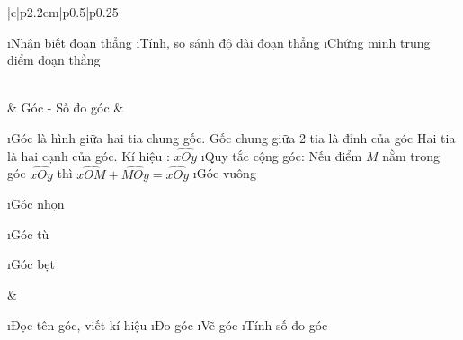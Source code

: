 \begin{tabular}{|c|p{2.2cm}|p{0.5\linewidth}|p{0.25\linewidth}|}
\begin{enumerate}[--,leftmargin=*]
		\i Nhận biết đoạn thẳng 
		\i Tính, so sánh độ dài đoạn thẳng 
		\i Chứng minh trung điểm đoạn thẳng
	\end{enumerate}\\
	 &	Góc - Số đo góc	&
	\begin{enumerate}[--,leftmargin=*]
		\i Góc là hình giữa hai tia chung gốc.
		Gốc chung giữa 2 tia là đỉnh của góc Hai tia là hai cạnh của góc. 
		Kí hiệu : $\widehat{xOy}$
		\i Quy tắc cộng góc: Nếu điểm $M$ nằm trong góc $\widehat{xOy}$ thì $\widehat{xOM}+\widehat{MOy}=\widehat{xOy}$
		\i Góc vuông  
		
		\i Góc nhọn
		
		\i Góc tù
		
		\i Góc bẹt  
	\end{enumerate} & 
	\begin{enumerate}[--,leftmargin=*]
		\i Đọc tên góc, viết kí hiệu 
		\i Đo góc 
		\i Vẽ góc
		\i Tính số đo góc
	\end{enumerate}
\end{tabular}

